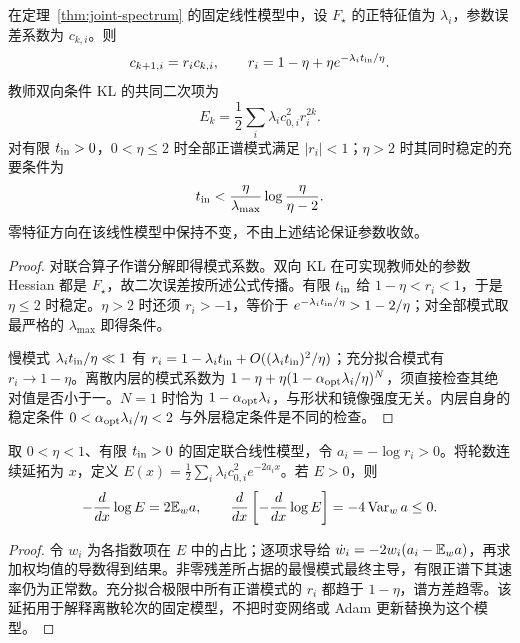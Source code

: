 \begin{corollary}
\label{cor:joint-stability}
在定理~\ref{thm:joint-spectrum} 的固定线性模型中，设 $F_\star$ 的正特征值为 $\lambda_i$，参数误差系数为 $c_{k,i}$。则
\begin{equation}
c_{k+1,i}=r_ic_{k,i},\qquad
r_i=1-\eta+\eta e^{-\lambda_i t_{\rm in}/\eta}.
\end{equation}
教师双向条件 KL 的共同二次项为
\begin{equation}
E_k=\frac12\sum_i\lambda_ic_{0,i}^2r_i^{2k}.
\end{equation}
对有限 $t_{\rm in}>0$，$0<\eta\le2$ 时全部正谱模式满足 $|r_i|<1$；$\eta>2$ 时其同时稳定的充要条件为
\begin{equation}
t_{\rm in}<\frac{\eta}{\lambda_{\max}}\log\frac{\eta}{\eta-2}.
\end{equation}
零特征方向在该线性模型中保持不变，不由上述结论保证参数收敛。
\end{corollary}
\begin{proof}
对联合算子作谱分解即得模式系数。双向 KL 在可实现教师处的参数 Hessian 都是 $F_\star$，故二次误差按所述公式传播。有限 $t_{\rm in}$ 给 $1-\eta<r_i<1$，于是 $\eta\le2$ 时稳定。$\eta>2$ 时还须 $r_i>-1$，等价于 $e^{-\lambda_i t_{\rm in}/\eta}>1-2/\eta$；对全部模式取最严格的 $\lambda_{\max}$ 即得条件。

慢模式 $\lambda_i t_{\rm in}/\eta\ll1$ 有 $r_i=1-\lambda_i t_{\rm in}+O((\lambda_i t_{\rm in})^2/\eta)$；充分拟合模式有 $r_i\to1-\eta$。离散内层的模式系数为 $1-\eta+\eta(1-\alpha_{\rm opt}\lambda_i/\eta)^N$，须直接检查其绝对值是否小于一。$N=1$ 时恰为 $1-\alpha_{\rm opt}\lambda_i$，与形状和镜像强度无关。内层自身的稳定条件 $0<\alpha_{\rm opt}\lambda_i/\eta<2$ 与外层稳定条件是不同的检查。
\end{proof}

\begin{proposition}[有限内层后的谱耗散]
\label{prop:outer-spectral-dissipation}
取 $0<\eta<1$、有限 $t_{\rm in}>0$ 的固定联合线性模型，令 $a_i=-\log r_i>0$。将轮数连续延拓为 $x$，定义 $E(x)=\frac12\sum_i\lambda_ic_{0,i}^2e^{-2a_ix}$。若 $E>0$，则
\begin{equation}
-\frac d{dx}\log E=2\mathbb E_w a,\qquad
\frac d{dx}\left[-\frac d{dx}\log E\right]=-4\operatorname{Var}_w a\le0.
\end{equation}
\end{proposition}
\begin{proof}
令 $w_i$ 为各指数项在 $E$ 中的占比；逐项求导给 $\dot w_i=-2w_i(a_i-\mathbb E_wa)$，再求加权均值的导数得到结果。非零残差所占据的最慢模式最终主导，有限正谱下其速率仍为正常数。充分拟合极限中所有正谱模式的 $r_i$ 都趋于 $1-\eta$，谱方差趋零。该延拓用于解释离散轮次的固定模型，不把时变网络或 Adam 更新替换为这个模型。
\end{proof}
